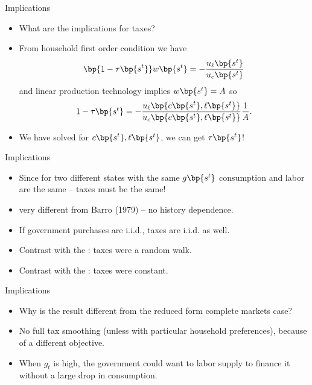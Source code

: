 \documentclass[11pt,xcolor={dvipsnames},hyperref={pdftex,pdfpagemode=UseNone,hidelinks,pdfdisplaydoctitle=true},usepdftitle=false]{beamer}
\begin{document}
    \begin{frame}{Implications}
        \begin{itemize}
        \item What are the implications for taxes?
        \item From household first order condition we have 
        \begin{align*}
            \bp{1-\tau\bp{s^t}} w\bp{s^t} = - \frac{u_\ell\bp{s^t}}{u_c\bp{s^t}}
        \end{align*}
        and linear production technology implies $w\bp{s^t} = A$ so
        \begin{align*}
            1-\tau\bp{s^t}  = - \frac{u_\ell\bp{c \bp{s^t},\ell\bp{s^t}}}{u_c\bp{c \bp{s^t},\ell\bp{s^t}}} \frac{1}{A}.
        \end{align*}
        \item We have solved for $c \bp{s^t},\ell\bp{s^t}$, we can get $\tau\bp{s^t}$!
        \end{itemize}
    \end{frame}
            
    \begin{frame}{Implications}
        \begin{itemize}
        \item Since for two different states with the same $g\bp{s^t}$ consumption and labor are the same -- taxes must be the same!
        \item {} very different from Barro (1979) -- no history dependence.
        \item If government purchases are i.i.d., taxes are i.i.d. as well.
        \item Contrast with the : taxes were a random walk.
        \item Contrast with the : taxes were constant.
        \end{itemize}
    \end{frame}

    \begin{frame}{Implications}
        \begin{itemize}
        \item Why is the result different from the reduced form complete markets case?
        \item No full tax smoothing (unless with particular household preferences), because of a different objective.
        \item When $g_t$ is high, the government could want to  labor supply to finance it without a large drop in consumption.
        \end{itemize}
    \end{frame}
\end{document}
